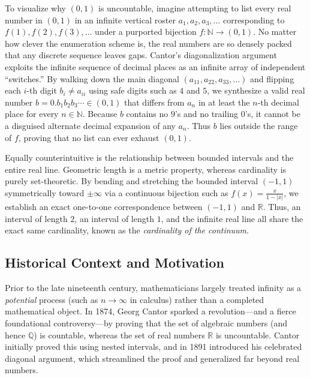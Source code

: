\documentclass[11pt, letterpaper]{article}
\theoremstyle{definition}
\theoremstyle{remark}
\begin{document}
To visualize why $(0, 1)$ is uncountable, imagine attempting to list every real number in $(0, 1)$ in an infinite vertical roster $a_1, a_2, a_3, \dots$ corresponding to $f(1), f(2), f(3), \dots$ under a purported bijection $f : \mathbb{N} \to (0, 1)$. No matter how clever the enumeration scheme is, the real numbers are so densely packed that any discrete sequence leaves gaps. Cantor's diagonalization argument exploits the infinite sequence of decimal places as an infinite array of independent ``switches.'' By walking down the main diagonal $(a_{11}, a_{22}, a_{33}, \dots)$ and flipping each $i$-th digit $b_i \neq a_{ii}$ using safe digits such as $4$ and $5$, we synthesize a valid real number $b = 0.b_1 b_2 b_3 \cdots \in (0, 1)$ that differs from $a_n$ in at least the $n$-th decimal place for every $n \in \mathbb{N}$. Because $b$ contains no $9$'s and no trailing $0$'s, it cannot be a disguised alternate decimal expansion of any $a_n$. Thus $b$ lies outside the range of $f$, proving that no list can ever exhaust $(0, 1)$.

Equally counterintuitive is the relationship between bounded intervals and the entire real line. Geometric length is a metric property, whereas cardinality is purely set-theoretic. By bending and stretching the bounded interval $(-1, 1)$ symmetrically toward $\pm \infty$ via a continuous bijection such as $f(x) = \frac{x}{1 - |x|}$, we establish an exact one-to-one correspondence between $(-1, 1)$ and $\mathbb{R}$. Thus, an interval of length $2$, an interval of length $1$, and the infinite real line all share the exact same cardinality, known as the \emph{cardinality of the continuum}.

\subsection{Historical Context and Motivation}

Prior to the late nineteenth century, mathematicians largely treated infinity as a \emph{potential} process (such as $n \to \infty$ in calculus) rather than a completed mathematical object. In 1874, Georg Cantor sparked a revolution—and a fierce foundational controversy—by proving that the set of algebraic numbers (and hence $\mathbb{Q}$) is countable, whereas the set of real numbers $\mathbb{R}$ is uncountable. Cantor initially proved this using nested intervals, and in 1891 introduced his celebrated diagonal argument, which streamlined the proof and generalized far beyond real numbers.
\end{document}
